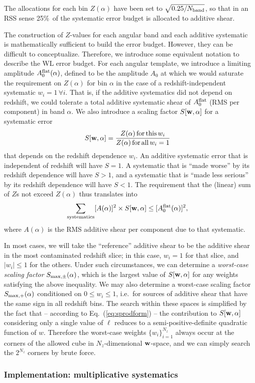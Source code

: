 The allocations for each bin $Z(\alpha)$ have been set to $\sqrt{0.25/N_{\rm band}}$, so that in an RSS sense 25\%\ of the systematic error budget is allocated to additive shear. 

The construction of $Z$-values for each angular band and each additive systematic is mathematically sufficient to build the error budget. However, they can be difficult to conceptualize. Therefore, we introduce some equivalent notation to describe the WL error budget. For each angular template, we introduce a limiting amplitude $A_0^{\rm flat}(\alpha)$, defined to be the amplitude $A_0$ at which we would saturate the requirement on $Z(\alpha)$ for bin $\alpha$ in the case of a redshift-independent systematic $w_i=1\,\forall i$. That is, if the additive systematics did not depend on redshift, we could tolerate a total additive systematic shear of $A_0^{\rm flat}$ (RMS per component) in band $\alpha$. We also introduce a scaling factor $S[{\bf w},\alpha]$ for a systematic error
\begin{equation}
S[{\bf w},\alpha] = \frac{Z(\alpha) \,{\rm for\,this\,}w_i}{Z(\alpha)\,{\rm for\,all\,}w_i=1}
\end{equation}
that depends on the redshift dependence $w_i$. An additive systematic error that is independent of redshift will have $S=1$. A systematic that is ``made worse'' by its redshift dependence will have $S>1$, and a systematic that is ``made less serious'' by its redshift dependence will have $S<1$. The requirement that the (linear) sum of $Z$s not exceed $Z(\alpha)$ thus translates into
\begin{equation}
\sum_{\rm systematics} [A(\alpha)]^2\times S[{\bf w},\alpha] \le [A_0^{\rm flat}(\alpha)]^2,
\label{eq:A-S-sum}
\end{equation}
where $A(\alpha)$ is the RMS additive shear per component due to that systematic.

In most cases, we will take the ``reference'' additive shear to be the additive shear in the most contaminated redshift slice; in this case, $w_i=1$ for that slice, and $|w_i|\le 1$ for the others. Under such circumstances, we can determine a {\em worst-case scaling factor} $S_{\rm max,\pm}(\alpha)$, which is the largest value of $S[{\bf w},\alpha]$ for any weights satisfying the above inequality. We may also determine a worst-case scaling factor $S_{\rm max,+}(\alpha)$ conditioned on $0\le w_i\le 1$, i.e.\ for sources of additive shear that have the same sign in all redshift bins. The search within these spaces is simplified by the fact that -- according to Eq.~(\ref{eq:sprodform}) -- the contribution to $S[{\bf w},\alpha]$ considering only a single value of $\ell$ reduces to a semi-positive-definite quadratic function of $w$. Therefore the worst-case weights $\{w_i\}_{i=1}^{N_z}$ always occur at the corners of the allowed cube in $N_z$-dimensional ${\bf w}$-space, and we can simply search the $2^{N_z}$ corners by brute force.

\subsubsection{Implementation: multiplicative systematics}
\label{ss:implement-mult}


